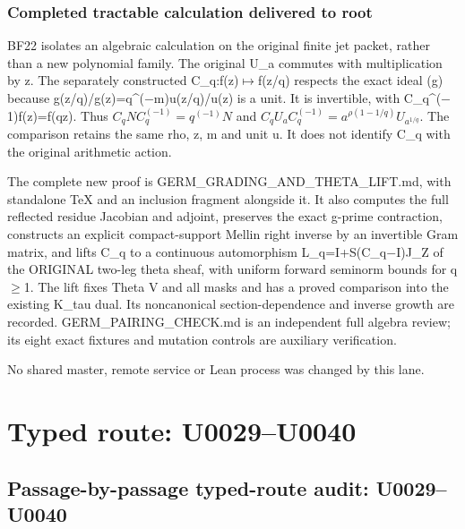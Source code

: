 \subsubsection{Completed tractable calculation delivered to
root}\label{completed-tractable-calculation-delivered-to-root}

BF22 isolates an algebraic calculation on the original finite jet
packet, rather than a new polynomial family. The original U\_a commutes
with multiplication by z. The separately constructed
C\_q:f(z)\allowbreak{}\ensuremath{↦}\allowbreak{}f(z/q) respects the
exact ideal (g) because
g(z/q)/g(z)=q\textasciicircum{}(\allowbreak{}\ensuremath{−}\allowbreak{}m)u(z/q)/u(z)
is a unit. It is invertible, with
C\_q\textasciicircum{}(\allowbreak{}\ensuremath{−}\allowbreak{}1)f(z)=f(qz).
Thus \(C_qNC_q^{(-1)}=q^{(-1)}N\) and
\(C_qU_aC_q^{(-1)}=a^{\rho(1-1/q)}U_{a^{1/q}}\). The comparison retains
the same rho, z, m and unit u. It does not identify C\_q with the
original arithmetic action.

The complete new proof is GERM\_GRADING\_AND\_THETA\_LIFT.md, with
standalone TeX and an inclusion fragment alongside it. It also computes
the full reflected residue Jacobian and adjoint, preserves the exact
g-prime contraction, constructs an explicit compact-support Mellin right
inverse by an invertible Gram matrix, and lifts C\_q to a continuous
automorphism L\_q=I+S(C\_q\allowbreak{}\ensuremath{−}\allowbreak{}I)J\_Z
of the ORIGINAL two-leg theta sheaf, with uniform forward seminorm
bounds for q\allowbreak{}\ensuremath{≥}\allowbreak{}1. The lift fixes
Theta V and all masks and has a proved comparison into the existing
K\_tau dual. Its noncanonical section-dependence and inverse growth are
recorded. GERM\_PAIRING\_CHECK.md is an independent full algebra review;
its eight exact fixtures and mutation controls are auxiliary
verification.

No shared master, remote service or Lean process was changed by this
lane.

\clearpage

\section{Typed route: U0029--U0040}\label{typed-route-u0029u0040}

\subsection{Passage-by-passage typed-route audit:
U0029--U0040}\label{passage-by-passage-typed-route-audit-u0029u0040}

